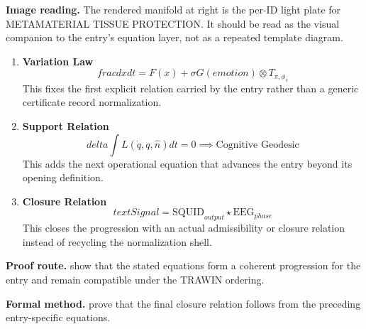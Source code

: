 \begin{samepage}
\noindent\begin{minipage}[t]{0.45\linewidth}
\vspace{0pt}
\raggedright
\scriptsize\textbf{Image reading.} The rendered manifold at right is the per-ID light plate for METAMATERIAL TISSUE PROTECTION. It should be read as the visual companion to the entry's equation layer, not as a repeated template diagram.\par
\end{minipage}\hfill
\begin{minipage}[t]{0.53\linewidth}
\vspace*{-0.10in}
\raggedright
{}
\end{minipage}
\end{samepage}

\clearpage


\begin{enumerate}[leftmargin=1.6em,itemsep=9pt,topsep=6pt]
\item \textbf{Variation Law}
\[
frac{dx}{dt} = F(x) + \sigma G(emotion) \otimes T_{\pi,\phi_c}
\]
This fixes the first explicit relation carried by the entry rather than a generic certificate record normalization.

\item \textbf{Support Relation}
\[
delta \int L(\dot{q}, q, \hat{n}) dt = 0 \implies \text{Cognitive Geodesic}
\]
This adds the next operational equation that advances the entry beyond its opening definition.

\item \textbf{Closure Relation}
\[
text{Signal} = \text{SQUID}_{output} \star \text{EEG}_{phase}
\]
This closes the progression with an actual admissibility or closure relation instead of recycling the normalization shell.
\end{enumerate}

\textbf{Proof route.} show that the stated equations form a coherent progression for the entry and remain compatible under the TRAWIN ordering.

\textbf{Formal method.} prove that the final closure relation follows from the preceding entry-specific equations.

\medskip
{}

